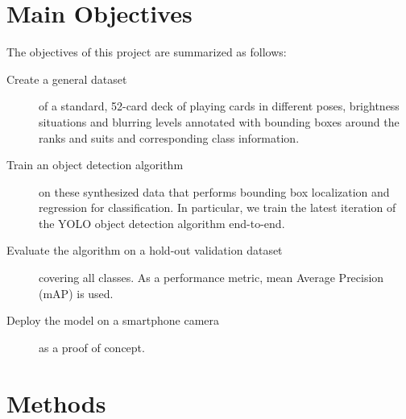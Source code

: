 \documentclass[a0,landscape]{a0poster}
\begin{document}
\begin{multicols}{3}
\color{DarkSlateGray} %

\section*{Main Objectives}
The objectives of this project are summarized as follows:

\begin{description}

\item[Create a general dataset] of a standard, 52-card deck of playing cards  in different poses, brightness situations and blurring levels annotated with bounding boxes around the ranks and suits and corresponding class information.
\item[Train an object detection algorithm] on these synthesized data that performs bounding box localization and regression for classification. In particular, we train  the latest iteration of the YOLO object detection algorithm \cite{DBLP:journals/corr/abs-1804-02767} end-to-end.
\item[Evaluate the algorithm on a hold-out validation dataset] covering all classes. As a performance metric, mean Average Precision (mAP) is used.
\item[Deploy the model on a smartphone camera] as a proof of concept.

\end{description}



\section*{Methods}

\end{multicols}
\end{document}
